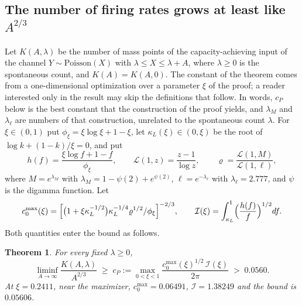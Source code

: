 \documentclass[10pt,letterpaper]{article}
\newtheorem{theorem}{Theorem}
\begin{document}
\subsection{The number of firing rates grows at least like $A^{2/3}$}\label{sec:thmC}

Let $K(A,\lambda)$ be the number of mass points of the capacity-achieving input of the channel $Y\sim\mathrm{Poisson}(X)$ with
$\lambda\le X\le\lambda+A$, where $\lambda\ge0$ is the spontaneous count, and $K(A)=K(A,0)$. The constant of the theorem comes from a one-dimensional optimization over a parameter
$\xi$ of the proof; a reader interested only in the result may skip the definitions that follow. In words, $c_P$ below is the best
constant that the construction of the proof yields, and $\lambda_M$ and $\lambda_\ell$ are numbers of that construction, unrelated to
the spontaneous count $\lambda$. For $\xi\in(0,1)$ put $\phi_\xi=\xi\log\xi+1-\xi$, let $\kappa_L(\xi)\in(0,\xi)$ be the root of
$\log k+(1-k)/\xi=0$, and put
\[
h(f)=\frac{\xi\log f+1-f}{\phi_\xi},\qquad
\mathcal L(1,z)=\frac{z-1}{\log z},\qquad
\varrho=\frac{\mathcal L(1,M)}{\mathcal L(1,\ell)},
\]
where $M=e^{\lambda_M}$ with $\lambda_M=1-\psi(2)+e^{\psi(2)}$, $\ell=e^{-\lambda_\ell}$ with $\lambda_\ell=2.777$, and $\psi$ is the
digamma function. Let
\[
c_{0}^{\max}(\xi)=\Bigl[\bigl(1+\xi\kappa_L^{-1/2}\bigr)\kappa_L^{-1/4}\varrho^{1/2}/\phi_\xi\Bigr]^{-2/3},\qquad
\mathcal I(\xi)=\int_{\kappa_L}^{1}\Bigl(\frac{h(f)}{f}\Bigr)^{1/2}df .
\]
Both quantities enter the bound as follows.

\begin{theorem}\label{thm:C}
For every fixed $\lambda\ge0$,
\[
\liminf_{A\to\infty}\frac{K(A,\lambda)}{A^{2/3}}\;\ge\;c_P:=\max_{0<\xi<1}\frac{c_{0}^{\max}(\xi)^{1/2}\,\mathcal I(\xi)}{2\pi}\;>\;0.0560 .
\]
At $\xi=0.2411$, near the maximizer, $c_{0}^{\max}=0.06491$, $\mathcal I=1.38249$ and the bound is $0.05606$.
\end{theorem}
\end{document}
